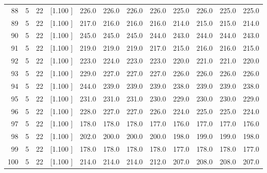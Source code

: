 \documentclass[12pt,a4paper]{article}
\begin{document}
\begin{center}
{\begin{tabular}{r r r r r r r r r r r r}
  88&  5& 22&[1.100     ]&   226.0&   226.0&   226.0&   226.0&   225.0&   226.0&   225.0&   225.0\\[-0.02in]
  89&  5& 22&[1.100     ]&   217.0&   216.0&   216.0&   216.0&   214.0&   215.0&   215.0&   214.0\\[-0.02in]
  90&  5& 22&[1.100     ]&   245.0&   245.0&   245.0&   244.0&   243.0&   244.0&   244.0&   243.0\\[-0.02in]
  91&  5& 22&[1.100     ]&   219.0&   219.0&   219.0&   217.0&   215.0&   216.0&   216.0&   215.0\\[-0.02in]
  92&  5& 22&[1.100     ]&   223.0&   224.0&   223.0&   223.0&   220.0&   221.0&   221.0&   220.0\\[-0.02in]
  93&  5& 22&[1.100     ]&   229.0&   227.0&   227.0&   227.0&   226.0&   226.0&   226.0&   226.0\\[-0.02in]
  94&  5& 22&[1.100     ]&   244.0&   239.0&   239.0&   239.0&   238.0&   239.0&   239.0&   238.0\\[-0.02in]
  95&  5& 22&[1.100     ]&   231.0&   231.0&   231.0&   230.0&   229.0&   230.0&   230.0&   229.0\\[-0.02in]
  96&  5& 22&[1.100     ]&   228.0&   227.0&   227.0&   226.0&   224.0&   225.0&   225.0&   224.0\\[-0.02in]
  97&  5& 22&[1.100     ]&   178.0&   178.0&   178.0&   177.0&   176.0&   177.0&   177.0&   176.0\\[-0.02in]
  98&  5& 22&[1.100     ]&   202.0&   200.0&   200.0&   200.0&   198.0&   199.0&   199.0&   198.0\\[-0.02in]
  99&  5& 22&[1.100     ]&   178.0&   178.0&   178.0&   178.0&   177.0&   178.0&   178.0&   177.0\\[-0.02in]
 100&  5& 22&[1.100     ]&   214.0&   214.0&   214.0&   212.0&   207.0&   208.0&   208.0&   207.0\\[-0.02in]

\hline
\end{tabular}}
\end{center}
\end{document}
